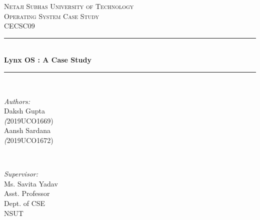\documentclass[12pt]{article}
\begin{document}
\begin{titlepage} %
	\newcommand{\HRule}{\rule{\linewidth}{0.5mm}} %
	
	\center %
	
	
	\textsc{\LARGE Netaji Subhas University of Technology}\\[1.5cm] %
	
	\textsc{\Large Operating System Case Study}\\[0.5cm] %
	
	\textsc{\large CECSC09}\\[0.5cm] %
	
	
	\HRule\\[0.4cm]
	
	{\huge\bfseries Lynx OS : A Case Study}\\[0.4cm] %
	
	\HRule\\[1.5cm]
	
	
\begin{minipage}{0.4\textwidth}
\begin{flushleft} \large
\emph{Authors:}\\
Daksh Gupta \\ \textit(2019UCO1669)\\Aansh Sardana\\ \textit(2019UCO1672)%
\end{flushleft}
\end{minipage}
~
\begin{minipage}{0.4\textwidth}
\begin{flushright} \large
\emph{Supervisor:} \\
Ms. Savita Yadav\\Asst. Professor\\Dept. of CSE\\NSUT %
\end{flushright}
\end{minipage}\\[1cm]
	

\end{titlepage}
\end{document}
